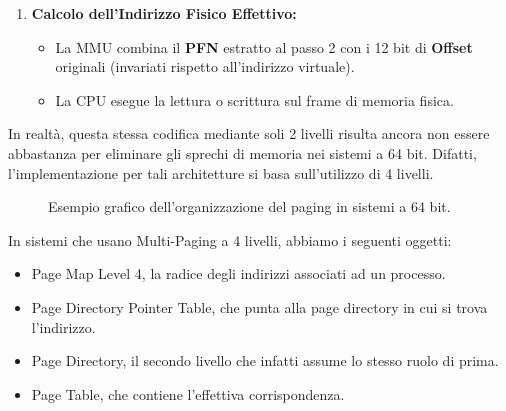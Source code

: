 \documentclass[12pt]{report}
\begin{document}
\begin{enumerate}
		\item \textbf{Calcolo dell'Indirizzo Fisico Effettivo:}
		\begin{itemize}
			\item La MMU combina il \textbf{PFN} estratto al passo 2 con i 12 bit di \textbf{Offset} originali (invariati rispetto all'indirizzo virtuale).
			
			\item La CPU esegue la lettura o scrittura sul frame di memoria fisica.
		\end{itemize}
	\end{enumerate}
	
	In realtà, questa stessa codifica mediante soli 2 livelli risulta ancora non essere abbastanza per eliminare gli sprechi di memoria nei sistemi a 64 bit. Difatti, l'implementazione per tali architetture si basa sull'utilizzo di 4 livelli.
	
	\vspace{1em}
	\begin{figure}[H]
		\centering
		\caption{Esempio grafico dell'organizzazione del paging in sistemi a 64 bit.}
	\end{figure}
	In sistemi che usano Multi-Paging a 4 livelli, abbiamo i seguenti oggetti:
	\begin{itemize}
		\item Page Map Level 4, la radice degli indirizzi associati ad un processo.
		
		\item Page Directory Pointer Table, che punta alla page directory in cui si trova l'indirizzo.
		
		\item Page Directory, il secondo livello che infatti assume lo stesso ruolo di prima.
		
		\item Page Table, che contiene l'effettiva corrispondenza.
	\end{itemize}
	
\end{document}

